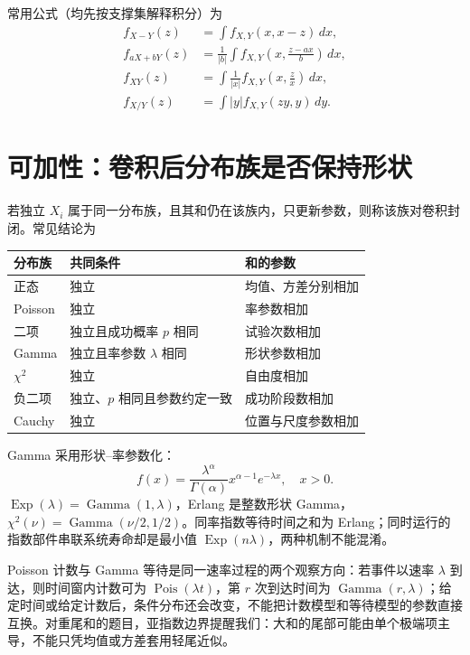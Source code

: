\documentclass[11pt,a4paper]{ctexart}
\begin{document}
常用公式（均先按支撑集解释积分）为
\begin{align*}
f_{X-Y}(z)&=\int f_{X,Y}(x,x-z)\,dx,\\
f_{aX+bY}(z)&=\frac1{\lvert b\rvert}\int f_{X,Y}\left(x,\frac{z-ax}{b}\right)\,dx,\\
f_{XY}(z)&=\int\frac1{\lvert x\rvert}f_{X,Y}\left(x,\frac zx\right)\,dx,\\
f_{X/Y}(z)&=\int \lvert y\rvert f_{X,Y}(zy,y)\,dy.
\end{align*}

\section{可加性：卷积后分布族是否保持形状}

若独立 $X_i$ 属于同一分布族，且其和仍在该族内，只更新参数，则称该族对卷积封闭。常见结论为
\begin{center}
\begin{tabularx}{\linewidth}{L{3.0cm}L{4.5cm}Y}
\toprule 分布族 & 共同条件 & 和的参数 \\
\midrule
正态 & 独立 & 均值、方差分别相加 \\
Poisson & 独立 & 率参数相加 \\
二项 & 独立且成功概率 $p$ 相同 & 试验次数相加 \\
Gamma & 独立且率参数 $\lambda$ 相同 & 形状参数相加 \\
$\chi^2$ & 独立 & 自由度相加 \\
负二项 & 独立、$p$ 相同且参数约定一致 & 成功阶段数相加 \\
Cauchy & 独立 & 位置与尺度参数相加 \\
\bottomrule
\end{tabularx}
\end{center}

Gamma 采用形状--率参数化：
\[
f(x)=\frac{\lambda^\alpha}{\Gamma(\alpha)}x^{\alpha-1}e^{-\lambda x},\quad x>0.
\]
$\operatorname{Exp}(\lambda)=\operatorname{Gamma}(1,\lambda)$，Erlang 是整数形状 Gamma，$\chi^2(\nu)=\operatorname{Gamma}(\nu/2,1/2)$。同率指数等待时间之和为 Erlang；同时运行的指数部件串联系统寿命却是最小值 $\operatorname{Exp}(n\lambda)$，两种机制不能混淆。

Poisson 计数与 Gamma 等待是同一速率过程的两个观察方向：若事件以速率 $\lambda$ 到达，则时间窗内计数可为 $\operatorname{Pois}(\lambda t)$，第 $r$ 次到达时间为 $\operatorname{Gamma}(r,\lambda)$；给定时间或给定计数后，条件分布还会改变，不能把计数模型和等待模型的参数直接互换。对重尾和的题目，亚指数边界提醒我们：大和的尾部可能由单个极端项主导，不能只凭均值或方差套用轻尾近似。
\end{document}
